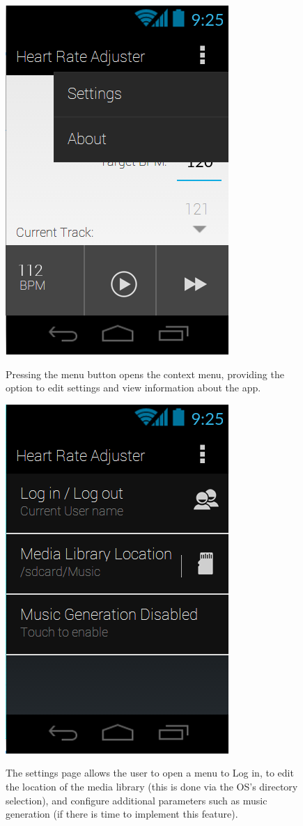 \documentclass[letterpaper,english]{scrreprt}
\begin{document}
\begin{figure}[H]
	\centering
	\includegraphics{mobile_ui/2.png}\\
	\caption{Pressing the menu button opens the context menu, providing the option to edit settings and view information about the app.}
\end{figure}

\begin{figure}[H]
	\centering
	\includegraphics{mobile_ui/3.png}\\
	\caption{The settings page allows the user to open a menu to Log in, to edit the location of the media library (this is done via the OS's directory selection), and configure additional parameters such as music generation (if there is time to implement this feature).}
\end{figure}
\end{document}
